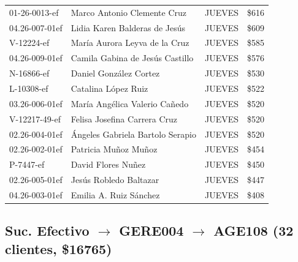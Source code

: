 \documentclass[11pt,a4paper]{article}
\newcommand{\money}[1]{\$\num{#1}}
\begin{document}
\begin{center}
\begin{longtable}{lp{5.5cm}lr}
01-26-0013-ef & Marco Antonio Clemente Cruz & JUEVES & \money{616} \\
04.26-007-01ef & Lidia Karen Balderas de Jes\'us & JUEVES & \money{609} \\
V-12224-ef & Mar\'ia Aurora Leyva de la Cruz & JUEVES & \money{585} \\
04.26-009-01ef & Camila Gabina de Jes\'us Castillo & JUEVES & \money{576} \\
N-16866-ef & Daniel Gonz\'alez Cortez & JUEVES & \money{530} \\
L-10308-ef & Catalina L\'opez Ruiz & JUEVES & \money{522} \\
03.26-006-01ef & Mar\'ia Ang\'elica Valerio Ca\~nedo & JUEVES & \money{520} \\
V-12217-49-ef & Felisa Josefina Carrera Cruz & JUEVES & \money{520} \\
02.26-004-01ef & \'Angeles Gabriela Bartolo Serapio & JUEVES & \money{520} \\
02.26-002-01ef & Patricia Mu\~noz Mu\~noz & JUEVES & \money{454} \\
P-7447-ef & David Flores Nu\~nez & JUEVES & \money{450} \\
02.26-005-01ef & Jes\'us Robledo Baltazar & JUEVES & \money{447} \\
04.26-003-01ef & Emilia A. Ruiz S\'anchez & JUEVES & \money{408} \\
\bottomrule
\end{longtable}
\end{center}

\subsection{Suc. Efectivo $\rightarrow$ GERE004 $\rightarrow$ AGE108 (32 clientes, \money{16765})}
\end{document}
